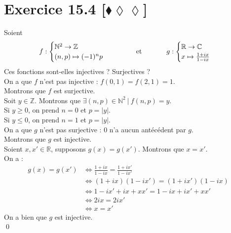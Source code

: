 \documentclass[10pt]{article}
\begin{document}
\section*{Exercice 15.4 [$\blacklozenge\lozenge\lozenge$]}
\begin{tcolorbox}[enhanced, width=7.6in, center, size=fbox, fontupper=\large, drop shadow southwest]
    Soient
    \begin{equation*}
        f : \begin{cases}\mathbb{N}^2 \to \mathbb{Z} \\ (n,p) \mapsto (-1)^np \end{cases} \hspace{1.25cm} \text{et} \hspace{1.25cm} g : \begin{cases}\mathbb{R} \to \mathbb{C} \\ x\mapsto \frac{1+ix}{1-ix} \end{cases}
    \end{equation*}
    Ces fonctions sont-elles injectives ? Surjectives ?\\[0.2cm]
    On a que $f$ n'est pas injective : $f(0,1) = f(2,1) = 1$.\\
    Montrons que $f$ est surjective.\\
    Soit $y\in\mathbb{Z}$. Montrons que $\exists (n,p)\in\mathbb{N}^2 ~ | ~ f(n,p) = y$.\\
    Si $y \geq 0$, on prend $n = 0$ et $p = |y|$.\\
    Si $y \leq 0$, on prend $n = 1$ et $p = |y|$.\\[0.2cm]
    On a que $g$ n'est pas surjective : $0$ n'a aucun antécédent par $g$.\\
    Montrons que $g$ est injective.\\
    Soient $x,x' \in \mathbb{R}$, supposons $g(x) = g(x')$. Montrons que $x=x'$.\\
    On a :
    \begin{align*}
        g(x) = g(x') &\iff \frac{1+ix}{1-ix} = \frac{1+ix'}{1-ix'}\\
        &\iff (1+ix)(1-ix') = (1+ix')(1-ix)\\
        &\iff 1 - ix' + ix + xx' = 1 - ix + ix' + xx'\\
        &\iff 2ix = 2ix'\\
        &\iff x = x' 
    \end{align*}
    On a bien que $g$ est injective.\\
    \qed
\end{tcolorbox}
\end{document}
